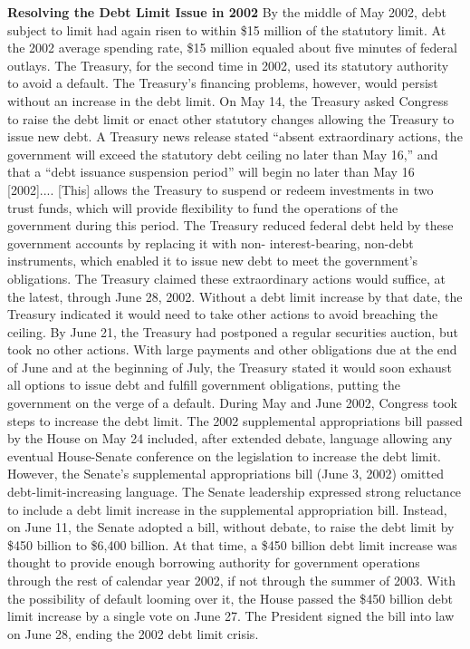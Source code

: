 \textbf{Resolving the Debt Limit Issue in 2002}
\newline
By the middle of May 2002, debt subject to limit had again risen to within \$15 million of the statutory limit. At the 2002 average spending rate, \$15 million equaled about five minutes of federal outlays. The Treasury, for the second time in 2002, used its statutory authority to avoid a default. The Treasury’s financing problems, however, would persist without an increase in the debt limit. On May 14, the Treasury asked Congress to raise the debt limit or enact other statutory changes allowing the Treasury to issue new debt. A Treasury news release stated “absent extraordinary actions, the government will exceed the statutory debt ceiling no later than May 16,” and that a “debt issuance suspension period” will begin no later than May 16 [2002].... [This] allows the Treasury to suspend or redeem investments in two trust funds, which will provide flexibility to fund the operations of the government during this period.
\newline \newline
The Treasury reduced federal debt held by these government accounts by replacing it with non- interest-bearing, non-debt instruments, which enabled it to issue new debt to meet the government’s obligations. The Treasury claimed these extraordinary actions would suffice, at the latest, through June 28, 2002. Without a debt limit increase by that date, the Treasury indicated it would need to take other actions to avoid breaching the ceiling. By June 21, the Treasury had postponed a regular securities auction, but took no other actions. With large payments and other obligations due at the end of June and at the beginning of July, the Treasury stated it would soon exhaust all options to issue debt and fulfill government obligations, putting the government on the verge of a default.
During May and June 2002, Congress took steps to increase the debt limit. The 2002 supplemental appropriations bill passed by the House on May 24 included, after extended debate, language allowing any eventual House-Senate conference on the legislation to increase the debt limit. However, the Senate’s supplemental appropriations bill (June 3, 2002) omitted debt-limit-increasing language. The Senate leadership expressed strong reluctance to include a debt limit increase in the supplemental appropriation bill. Instead, on June 11, the Senate adopted a bill, without debate, to raise the debt limit by \$450 billion to \$6,400 billion. At that time, a \$450 billion debt limit increase was thought to provide enough borrowing authority for government operations through the rest of calendar year 2002, if not through the summer of 2003. With the possibility of default looming over it, the House passed the \$450 billion debt limit increase by a single vote on June 27. The President signed the bill into law on June 28, ending the 2002 debt limit crisis.


